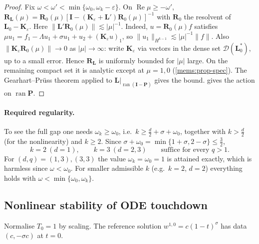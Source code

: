 \begin{proof}
Fix $\omega<\omega'<\min\{\omega_0,\omega_k-\varepsilon\}$. On $\operatorname{Re}\mu\ge-\omega'$,
$\mathbf R_{\mathbf L}(\mu)=\mathbf R_0(\mu)[\mathbf I-(\mathbf K_\varepsilon+\mathbf L')\mathbf R_0(\mu)]^{-1}$ with
$\mathbf R_0$ the resolvent of $\mathbf L_0-\mathbf K_\varepsilon$. Here
$\|\mathbf L'\mathbf R_0(\mu)\|\lesssim|\mu|^{-1}$. Indeed, $u=\mathbf R_0(\mu)f$
satisfies $\mu u_1=f_1-\Lambda u_1+\sigma u_1+u_2+(\mathbf K_\varepsilon u)_1$, so
$\|u_1\|_{H^{k-1}}\lesssim|\mu|^{-1}\|f\|$. Also
$\|\mathbf K_\varepsilon\mathbf R_0(\mu)\|\to0$ as $|\mu|\to\infty$: write $\mathbf K_\varepsilon$
via vectors in the dense set $\mathcal D(\mathbf L_0^*)$, up to a small error.
Hence $\mathbf R_{\mathbf L}$ is uniformly bounded for $|\mu|$ large. On the
remaining compact set it is analytic except at $\mu=1,0$
(\cref{mems:prop-spec}). The Gearhart--Prüss theorem
\cite[V.1.11]{EngelNagel2000} applied to $\mathbf L|_{\operatorname{ran}(\mathbf I-\mathbf P)}$
gives the bound.  gives the action on $\operatorname{ran}\mathbf P$.
\end{proof}

\paragraph{Required regularity.} To see the full gap one needs $\omega_k\ge\omega_0$,
i.e.\ $k\ge\frac d2+\sigma+\omega_0$, together with $k>\frac d2$ (for the
nonlinearity) and $k\ge2$. Since $\sigma+\omega_0=\min\{1+\sigma,2-\sigma\}\le\frac32$,
\[
  k=2\ (d=1),\qquad k=3\ (d=2,3)\qquad\text{suffice for every }q>1 .
\]
For $(d,q)=(1,3),(3,3)$ the value $\omega_k=\omega_0=1$ is attained exactly, which is
harmless since $\omega<\omega_0$. For smaller admissible $k$ (e.g.\ $k=2$, $d=2$) everything
holds with $\omega<\min\{\omega_0,\omega_k\}$.

\subsection{Nonlinear stability of ODE touchdown}
\label{mems:sec-nonlin}
Normalise $T_0=1$ by scaling. The reference solution $w^{1,0}=c(1-t)^\sigma$ has
data $(c,-\sigma c)$ at $t=0$.

